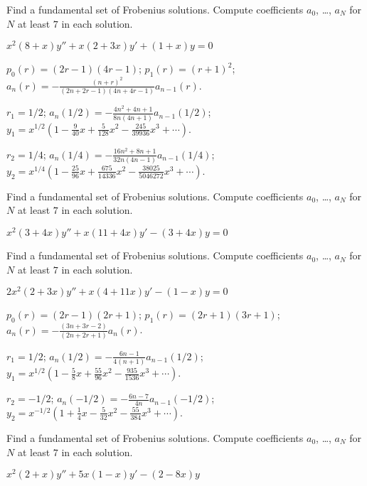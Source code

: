 \documentclass{ximera}
\begin{document}
\begin{problem}\label{exer:7.5.28} 
Find a
fundamental set of Frobenius solutions. Compute
coefficients $a_0$, \dots, $a_N$ for $N$ at least $7$ in each solution.

$x^2(8+x)y''+x(2+3x)y'+(1+x)y=0$

\begin{solution}
    $p_0(r)=(2r-1)(4r-1)$;
$p_1(r)=(r+1)^2$;
$a_n(r)=-\frac{(n+r)^2}{(2n+2r-1)(4n+4r-1)} a_{n-1}(r)$.

$r_1=1/2$;
$a_n(1/2)=-\frac{4n^2+4n+1}{8n(4n+1)} a_{n-1}(1/2)$;
$y_1=x^{1/2}\left(1-\frac{9}{40}x+\frac{5}{128}x^2-\frac{245}{39936}x^3
+\cdots\right)$.

$r_2=1/4$;
$a_n(1/4)=-\frac{16n^2+8n+1}{32n(4n-1)} a_{n-1}(1/4)$;
$y_2=x^{1/4}\left(1-\frac{25}{96}x+\frac{675}{14336}x^2-
\frac{38025}{5046272}x^3
+\cdots\right)$.
\end{solution}
\end{problem}

\begin{problem}\label{exer:7.5.29}
Find a
fundamental set of Frobenius solutions. Compute
coefficients $a_0$, \dots, $a_N$ for $N$ at least $7$ in each solution.

$x^2(3+4x)y''+x(11+4x)y'-(3+4x)y=0$
\end{problem}

\begin{problem}\label{exer:7.5.30}
Find a
fundamental set of Frobenius solutions. Compute
coefficients $a_0$, \dots, $a_N$ for $N$ at least $7$ in each solution.

$2x^2(2+3x)y''+x(4+11x)y'-(1-x)y=0$

\begin{solution}
    $p_0(r)=(2r-1)(2r+1)$;
$p_1(r)=(2r+1)(3r+1)$;
$a_n(r)=-\frac{(3n+3r-2)}{(2n+2r+1)} a_n(r)$.

$r_1=1/2$;
$a_n(1/2)=-\frac{6n-1}{4(n+1)} a_{n-1}(1/2)$;
$y_1=x^{1/2}\left(1-\frac{5}{8}x+\frac{55}{96}x^2
-\frac{935}{1536}x^3+\cdots\right)$.

$r_2=-1/2$;
$a_n(-1/2)=-\frac{6n-7}{4n} a_{n-1}(-1/2)$;
$y_2=x^{-1/2}\left(1+\frac{1}{4}x-\frac{5}{32}x^2
-\frac{55}{384}x^3+\cdots\right)$.
\end{solution}
\end{problem}

\begin{problem}\label{exer:7.5.31}
Find a
fundamental set of Frobenius solutions. Compute
coefficients $a_0$, \dots, $a_N$ for $N$ at least $7$ in each solution.

$x^2(2+x)y''+5x(1-x)y'-(2-8x)y$
\end{problem}
\end{document}
